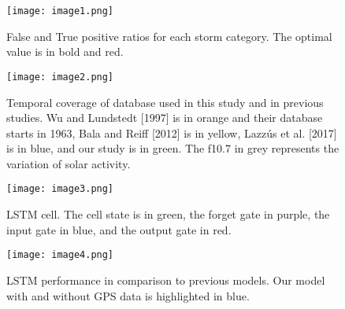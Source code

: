 
\begin{figure}
	\texttt{[image: image1.png]}
	\caption{False and True positive ratios for each storm category. The optimal value is in bold and red.}
	\label{fig:tpfp}
\end{figure}





\begin{figure}
	\texttt{[image: image2.png]}
	\caption{Temporal coverage of database used in this study and in previous studies. Wu and Lundstedt [1997] is in orange and their database starts in 1963, Bala and Reiff [2012] is in yellow, Lazzús et al. [2017] is in blue, and our study is in green. The f10.7 in grey represents the variation of solar activity.}
	\label{fig:datacoverage}
\end{figure}





\begin{figure}
	\noindent\texttt{[image: image3.png]}
	\caption{LSTM cell. The cell state is in green, the forget gate in purple, the input gate in blue, and the output gate in red.}
	\label{fig:lstmcell}
\end{figure}






\begin{figure}
	\texttt{[image: image4.png]}
	\caption{LSTM performance in comparison to previous models. Our model with and without GPS data is highlighted in blue.}
	\label{fig:lstmperf}
\end{figure}






